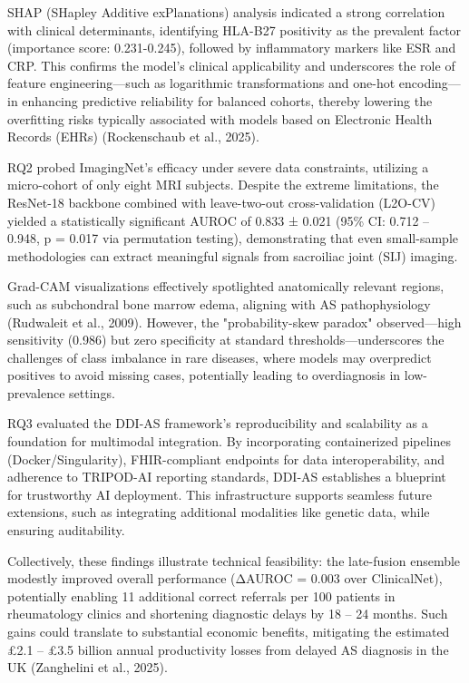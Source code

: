 \documentclass[12pt, a4paper]{article}
\begin{document}
SHAP (SHapley Additive exPlanations) analysis indicated a strong correlation with clinical determinants, identifying HLA-B27 positivity as the prevalent factor (importance score: 0.231-0.245), followed by inflammatory markers like ESR and CRP. This confirms the model's clinical applicability and underscores the role of feature engineering—such as logarithmic transformations and one-hot encoding—in enhancing predictive reliability for balanced cohorts, thereby lowering the overfitting risks typically associated with models based on Electronic Health Records (EHRs) (Rockenschaub et al., 2025).

RQ2 probed ImagingNet's efficacy under severe data constraints, utilizing a micro-cohort of only eight MRI subjects. Despite the extreme limitations, the ResNet-18 backbone combined with leave-two-out cross-validation (L2O-CV) yielded a statistically significant AUROC of 0.833 ± 0.021 (95\% CI: 0.712 -- 0.948, p = 0.017 via permutation testing), demonstrating that even small-sample methodologies can extract meaningful signals from sacroiliac joint (SIJ) imaging. 

Grad-CAM visualizations effectively spotlighted anatomically relevant regions, such as subchondral bone marrow edema, aligning with AS pathophysiology (Rudwaleit et al., 2009). However, the "probability-skew paradox" observed—high sensitivity (0.986) but zero specificity at standard thresholds—underscores the challenges of class imbalance in rare diseases, where models may overpredict positives to avoid missing cases, potentially leading to overdiagnosis in low-prevalence settings.

RQ3 evaluated the DDI-AS framework's reproducibility and scalability as a foundation for multimodal integration. By incorporating containerized pipelines (Docker/Singularity), FHIR-compliant endpoints for data interoperability, and adherence to TRIPOD-AI reporting standards, DDI-AS establishes a blueprint for trustworthy AI deployment. This infrastructure supports seamless future extensions, such as integrating additional modalities like genetic data, while ensuring auditability. 

Collectively, these findings illustrate technical feasibility: the late-fusion ensemble modestly improved overall performance (ΔAUROC = 0.003 over ClinicalNet), potentially enabling 11 additional correct referrals per 100 patients in rheumatology clinics and shortening diagnostic delays by 18 -- 24 months. Such gains could translate to substantial economic benefits, mitigating the estimated \pounds2.1 -- \pounds3.5 billion annual productivity losses from delayed AS diagnosis in the UK (Zanghelini et al., 2025). 
\end{document}

